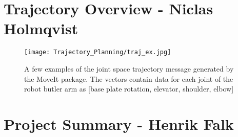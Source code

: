 \section{Trajectory Overview - Niclas Holmqvist}
\label{app:urdf}



\begin{figure}[!ht]
\centering
    \texttt{[image: Trajectory\_Planning/traj\_ex.jpg]}
    \caption{A few examples of the joint space trajectory message generated by the MoveIt package. The vectors contain data for each joint of the robot butler arm as [base plate rotation, elevator, shoulder, elbow]}
    \label{traj_ex}
\end{figure}

\clearpage

\section{Project Summary - Henrik Falk}
\label{appendix:summary}


